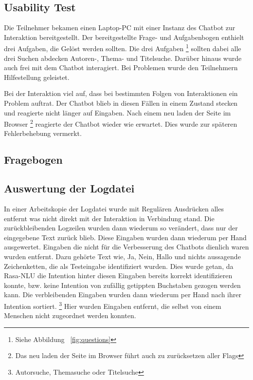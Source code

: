 \documentclass[12pt,a4paper]{article}
\begin{document}
\subsection{Usability Test}

Die Teilnehmer bekamen einen Laptop-PC mit einer Instanz des Chatbot zur Interaktion bereitgestellt.
Der bereitgestellte Frage- und Aufgabenbogen enthielt drei Aufgaben, die Gelöst werden sollten.
Die drei Aufgaben%
\footnote{Siehe Abbildung ~\ref{fig:questions}}
sollten dabei alle drei Suchen abdecken Autoren-, Thema- und Titelsuche.
Darüber hinaus wurde auch frei mit dem Chatbot interagiert.
Bei Problemen wurde den Teilnehmern Hilfestellung geleistet.

Bei der Interaktion viel auf, dass bei bestimmten Folgen von Interaktionen ein Problem auftrat.
Der Chatbot blieb in diesen Fällen in einem Zustand stecken und reagierte nicht länger auf Eingaben.
Nach einem neu laden der Seite im Browser%
\footnote{Das neu laden der Seite im Browser führt auch zu zurücksetzen aller Flags}
reagierte der Chatbot wieder wie erwartet.
Dies wurde zur späteren Fehlerbehebung vermerkt.



\subsection{Fragebogen}

\subsection{Auswertung der Logdatei}

In einer Arbeitskopie der Logdatei wurde mit Regulären Ausdrücken alles entfernt was nicht direkt mit der Interaktion in Verbindung stand.
Die zurückbleibenden Logzeilen wurden dann wiederum so verändert, dass nur der eingegebene Text zurück blieb.
Diese Eingaben wurden dann wiederum per Hand ausgewertet.
Eingaben die nicht für die Verbesserung des Chatbots dienlich waren wurden entfernt.
Dazu gehörte Text wie, {\glqq}Ja{\grqq}, {\glqq}Nein{\grqq}, {\glqq}Hallo{\grqq} und nichts aussagende Zeichenketten, die als Testeingabe identifiziert wurden.
Dies wurde getan, da Rasa-NLU die Intention hinter diesen Eingaben bereits korrekt identifizieren konnte, bzw. keine Intention von zufällig getippten Buchstaben gezogen werden kann.
Die verbleibenden Eingaben wurden dann wiederum per Hand nach ihrer Intention sortiert.%
\footnote{Autorsuche, Themasuche oder Titelsuche}
Hier wurden Eingaben entfernt, die selbst von einem Menschen nicht zugeordnet werden konnten.
\end{document}
